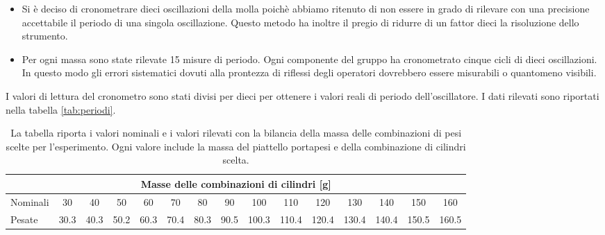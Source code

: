 \begin{itemize}
	\item{Si è deciso di cronometrare dieci oscillazioni della molla
        poichè abbiamo ritenuto di non essere in grado di rilevare con una precisione
        accettabile il periodo di una singola oscillazione. Questo metodo ha inoltre
        il pregio di ridurre di un fattor dieci la risoluzione dello strumento.}

	\item{Per ogni massa sono state rilevate 15 misure di periodo.
        Ogni componente del gruppo ha cronometrato cinque cicli di dieci oscillazioni. 
        In questo modo gli errori sistematici dovuti alla prontezza di riflessi degli
        operatori dovrebbero essere misurabili o quantomeno visibili.}
\end{itemize}

I valori di lettura del cronometro sono stati divisi per dieci per ottenere i valori reali di periodo dell'oscillatore.
I dati rilevati sono riportati nella tabella \ref{tab:periodi}.

\begin{table}
    \centering
    \scriptsize
    \begin{tabular}{l | c c c c c c c c c c c c c c}
        \multicolumn{15}{c}{\small \textbf{Masse delle combinazioni di cilindri [g]}} \\[1mm]
        \toprule
        Nominali & 30 & 40 & 50 & 60 & 70 & 80& 90 & 100 & 110 & 120 & 130 & 140 & 150 & 160 \\
        Pesate & 30.3 & 40.3 & 50.2 & 60.3 & 70.4 & 80.3 & 90.5 & 100.3 & 110.4 & 120.4 & 130.4 & 140.4 & 150.5 & 160.5 \\
        \bottomrule
    \end{tabular}
    \caption{La tabella riporta i valori nominali e i valori rilevati con la bilancia della massa delle combinazioni di pesi scelte per
    l'esperimento. Ogni valore include la massa del piattello portapesi e della combinazione di cilindri scelta.}
    \label{tab:masse_dinamico}
\end{table}

